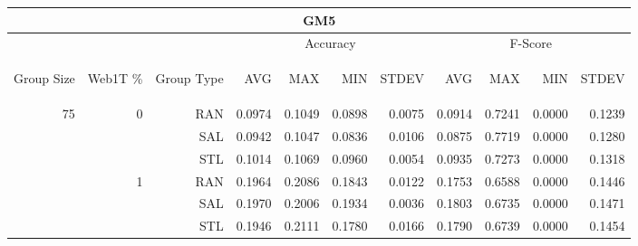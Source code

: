 \begin{center}
\begin{table}[htbp]
\begin{tabular}{ | r | r | r | r | r | r | r | r | r | r | r |}
\hline
\multicolumn{11}{|c|}{GM5}\\
\hline
 & & & \multicolumn{4}{|c|}{Accuracy} & \multicolumn{4}{|c|}{F-Score}\\ \cline{4-11}
\begin{sideways}Group Size\end{sideways} & \begin{sideways}Web1T \%\end{sideways} & \begin{sideways}Group Type\end{sideways} & \begin{sideways}AVG\end{sideways} & \begin{sideways}MAX\end{sideways} & \begin{sideways}MIN\end{sideways} & \begin{sideways}STDEV\end{sideways} & \begin{sideways}AVG\end{sideways} & \begin{sideways}MAX\end{sideways} & \begin{sideways}MIN\end{sideways} & \begin{sideways}STDEV\end{sideways}\\
\hline
\multirow{18}{*}{75}
 & \multirow{3}{*}{0} & RAN & 0.0974 & 0.1049 & 0.0898 & 0.0075 & 0.0914 & 0.7241 & 0.0000 & 0.1239\\ \cline{3-11}
 &   & SAL & 0.0942 & 0.1047 & 0.0836 & 0.0106 & 0.0875 & 0.7719 & 0.0000 & 0.1280\\ \cline{3-11}
 &   & STL & 0.1014 & 0.1069 & 0.0960 & 0.0054 & 0.0935 & 0.7273 & 0.0000 & 0.1318\\ \cline{2-11}
 & \multirow{3}{*}{1} & RAN & 0.1964 & 0.2086 & 0.1843 & 0.0122 & 0.1753 & 0.6588 & 0.0000 & 0.1446\\ \cline{3-11}
 &   & SAL & 0.1970 & 0.2006 & 0.1934 & 0.0036 & 0.1803 & 0.6735 & 0.0000 & 0.1471\\ \cline{3-11}
 &   & STL & 0.1946 & 0.2111 & 0.1780 & 0.0166 & 0.1790 & 0.6739 & 0.0000 & 0.1454\\ \cline{2-11}

\end{tabular}
\end{table}
\end{center}
